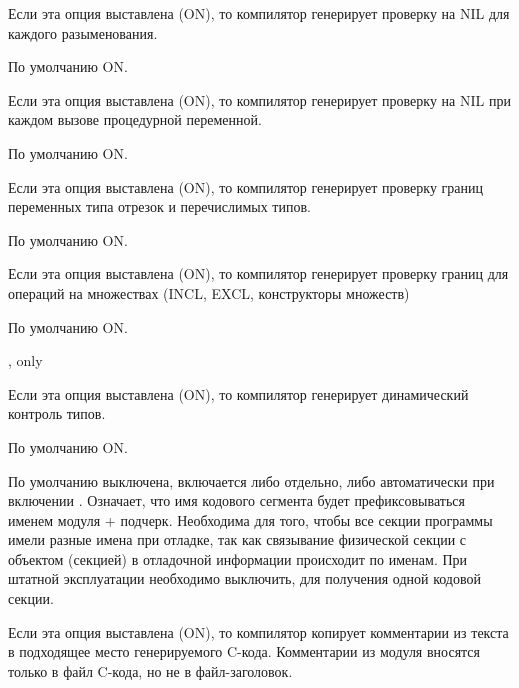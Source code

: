 \begin{description}
        \MLBegin{}\ModeC{}\MLEnd{} \inline

Если эта опция выставлена (ON), то компилятор генерирует проверку на NIL
для каждого разыменования.

По умолчанию ON.

        \MLBegin{}\ModeC{}\MLEnd{} \inline

Если эта опция выставлена (ON), то компилятор генерирует проверку на NIL
при каждом вызове процедурной переменной.

По умолчанию ON.

        \MLBegin{}\ModeC{}\MLEnd{} \inline

Если эта опция выставлена (ON), то компилятор генерирует проверку 
границ переменных типа отрезок и перечислимых типов.

По умолчанию ON.

        \MLBegin{}\ModeC{}\MLEnd{} \inline

Если эта опция выставлена (ON), то компилятор генерирует проверку 
границ для операций на множествах (INCL, EXCL, конструкторы множеств)

По умолчанию ON.

        \MLBegin{}\ModeC{}, \ot{} only\MLEnd{} \inline

Если эта опция выставлена (ON), то компилятор генерирует 
динамический контроль типов.

По умолчанию ON.

\ifgenvax
{}
        \MLBegin{}\ModeC{}\MLEnd{}

По умолчанию выключена, включается либо отдельно, 
либо автоматически при включении .  
Означает, что имя кодового сегмента будет префиксовываться 
именем модуля + подчерк. Необходима для того, 
чтобы все секции программы имели разные имена при отладке, 
так как связывание физической секции с объектом (секцией) 
в отладочной информации происходит по именам. 
При штатной эксплуатации необходимо выключить, 
для получения одной кодовой секции.
\fi


\ifgenc
{}
        \MLBegin{}\ModeC{}\MLEnd{} \header

Если эта опция выставлена (ON), то компилятор копирует комментарии 
из текста в подходящее место генерируемого C-кода. Комментарии
из \ot{} модуля вносятся только в файл C-кода, но не в файл-заголовок.
\fi


\end{description}
